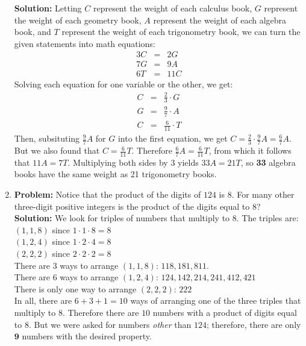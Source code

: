 \documentclass{article}
\begin{document}
\begin{enumerate}
\textbf{Solution:} Letting $C$ represent the weight of each calculus book, $G$ represent the weight of each geometry book, $A$ represent the weight of each algebra book, and $T$ represent the weight of each trigonometry book, we can turn the given statements into math equations: \\
\begin{eqnarray*}
3C &=& 2G \\
7G &=& 9A \\
6T &=& 11C
\end{eqnarray*}
Solving each equation for one variable or the other, we get: \\
\begin{eqnarray*}
C &=& \frac{2}{3} \cdot G \\
G &=& \frac{9}{7} \cdot A \\
C &=& \frac{6}{11} \cdot T
\end{eqnarray*}
Then, subsituting $\frac{9}{7} A$ for $G$ into the first equation, we get $C = \frac{2}{3} \cdot \frac{9}{7} A = \frac{6}{7} A$.  But we also found that $C = \frac{6}{11} T$.  Therefore $\frac{6}{7} A =  \frac{6}{11} T$, from which it follows that $11A = 7T$.  Multiplying both sides by 3 yields $33A = 21T$, so \textbf{33} algebra books have the same weight as 21 trigonometry books.

\item \textbf{Problem:} Notice that the product of the digits of $124$ is $8$.  For many other three-digit positive integers is the product of the digits equal to $8$? \\

\textbf{Solution:} We look for triples of numbers that multiply to 8.  The triples are: \\
$(1,1,8)$ since $1 \cdot 1 \cdot 8 = 8$ \\
$(1,2,4)$ since $1 \cdot 2 \cdot 4 = 8$ \\
$(2,2,2)$ since $2 \cdot 2 \cdot 2 = 8$ \\

There are $3$ ways to arrange $(1,1,8)$: $118, 181, 811$. \\
There are $6$ ways to arrange $(1,2,4)$: $124, 142, 214, 241, 412, 421$ \\
There is only one way to arrange $(2,2,2)$: $222$ \\

In all, there are $6+3+1 = 10$ ways of arranging one of the three triples that multiply to $8$.  Therefore there are $10$ numbers with a product of digits equal to $8$.  But we were asked for numbers \textit{other} than $124$; therefore, there are only $\mathbf{9}$ numbers with the desired property.


\end{enumerate}
\end{document}

